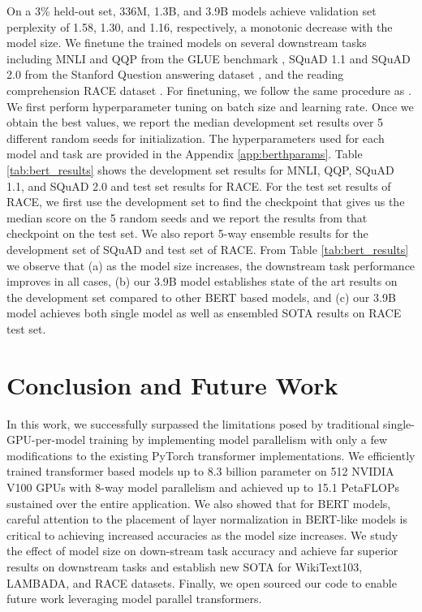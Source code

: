 \documentclass{article}
\begin{document}
On a 3\% held-out set, 336M, 1.3B, and 3.9B models achieve validation set perplexity of 1.58, 1.30, and 1.16, respectively, a monotonic decrease with the model size. We finetune the trained models on several downstream tasks including MNLI and QQP from the GLUE benchmark \cite{GLUE2019}, SQuAD 1.1 and SQuAD 2.0 from the Stanford Question answering dataset \cite{SQUAD1,SQUAD2}, and the reading comprehension RACE dataset \cite{RACE}. For finetuning, we follow the same procedure as \cite{roberta}. We first perform hyperparameter tuning on batch size and learning rate. Once we obtain the best values, we report the median development set results over 5 different random seeds for initialization. The hyperparameters used for each model and task are provided in the Appendix \ref{app:berthparams}. Table \ref{tab:bert_results} shows the development set results for MNLI, QQP, SQuAD 1.1, and SQuAD 2.0 and test set results for RACE. For the test set results of RACE, we first use the development set to find the checkpoint that gives us the median score on the 5 random seeds and we report the results from that checkpoint on the test set. We also report 5-way ensemble results for the development set of SQuAD and test set of RACE. From Table \ref{tab:bert_results} we observe that (a) as the model size increases, the downstream task performance improves in all cases, (b) our 3.9B model establishes state of the art results on the development set compared to other BERT based models, and (c) our 3.9B model achieves both single model as well as ensembled  SOTA results on RACE test set. 

 \section{Conclusion and Future Work}

In this work, we successfully surpassed the limitations posed by traditional single-GPU-per-model training by implementing model parallelism with only a few modifications to the existing PyTorch transformer implementations. We efficiently trained transformer based models up to 8.3 billion parameter on 512 NVIDIA V100 GPUs with 8-way model parallelism and achieved up to 15.1 PetaFLOPs sustained over the entire application. We also showed that for BERT models, careful attention to the placement of layer normalization in BERT-like models is critical to achieving increased accuracies as the model size increases. We study the effect of model size on down-stream task accuracy and achieve far superior results on downstream tasks and establish new SOTA for WikiText103, LAMBADA, and RACE datasets. Finally, we open sourced our code to enable future work leveraging model parallel transformers.
\end{document}
